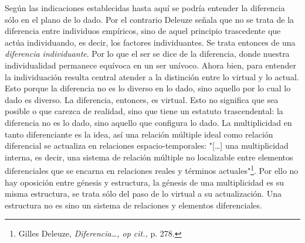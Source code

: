 \documentclass{book}
\begin{document}
Según las indicaciones establecidas hasta aquí se podría entender la
diferencia sólo en el plano de lo dado. Por el contrario Deleuze señala
que no se trata de la diferencia entre individuos empíricos, sino de
aquel principio trascedente que actúa individuando, es decir, los
factores individuantes. Se trata entonces de una \emph{diferencia
individuante}. Por lo que el ser se dice de la diferencia, donde nuestra
individualidad permanece equívoca en un ser unívoco. Ahora bien, para
entender la individuación resulta central atender a la distinción entre
lo virtual y lo actual. Esto porque la diferencia no es lo diverso en lo
dado, sino aquello por lo cual lo dado es diverso. La diferencia,
entonces, es virtual. Esto no significa que sea posible o que carezca de
realidad, sino que tiene un estatuto trascendental: la diferencia no es
lo dado, sino aquello que configura lo dado. La multiplicidad en tanto
diferenciante es la idea, así una relación múltiple ideal como relación
diferencial se actualiza en relaciones espacio-temporales: "{[}\ldots{]}
una multiplicidad interna, es decir, una sistema de relación múltiple no
localizable entre elementos diferenciales que se encarna en relaciones
reales y términos actuales"\footnote{Gilles Deleuze,
  \emph{Diferencia\ldots, op cit.,} p. 278.}. Por ello no hay oposición
entre génesis y estructura, la génesis de una multiplicidad es su misma
estructura, se trata sólo del paso de lo virtual a su actualización. Una
estructura no es sino un sistema de relaciones y elementos
diferenciales.
\end{document}
